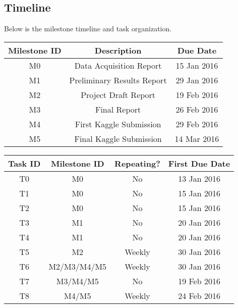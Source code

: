 \documentclass[12pt]{article}
\begin{document}
\subsection{Timeline}
Below is the milestone timeline and task organization.
\begin{center}
	\begin{tabular}{|c|c|c|}
		\hline
		Milestone ID & Description & Due Date \\
		\hline
		M0 & Data Acquisition Report & 15 Jan 2016 \\
		M1 & Preliminary Results Report & 29 Jan 2016 \\
		M2 & Project Draft Report & 19 Feb 2016 \\
		M3 & Final Report & 26 Feb 2016 \\
		M4 & First Kaggle Submission & 29 Feb 2016 \\
		M5 & Final Kaggle Submission & 14 Mar 2016 \\
		\hline
	\end{tabular}
\end{center}
\begin{center}
	\begin{tabular}{|c|c|c|c|}
		\hline
		Task ID & Milestone ID & Repeating? & First Due Date \\
		\hline
		T0 & M0 & No & 13 Jan 2016 \\
		T1 & M0 & No & 15 Jan 2016 \\
		T2 & M0 & No & 15 Jan 2016 \\
		T3 & M1 & No & 20 Jan 2016 \\
		T4 & M1 & No & 20 Jan 2016 \\
		T5 & M2 & Weekly & 30 Jan 2016 \\
		T6 & M2/M3/M4/M5 & Weekly & 30 Jan 2016 \\
		T7 & M3/M4/M5 & No & 19 Feb 2016 \\
		T8 & M4/M5 & Weekly & 24 Feb 2016 \\
		\hline
	\end{tabular}
\end{center}
\end{document}

